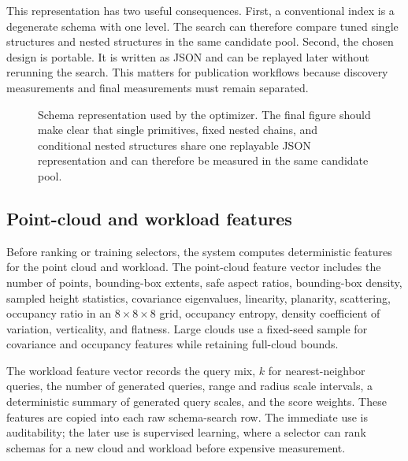 This representation has two useful consequences. First, a conventional index is a degenerate schema with one level. The search can therefore compare tuned single structures and nested structures in the same candidate pool. Second, the chosen design is portable. It is written as JSON and can be replayed later without rerunning the search. This matters for publication workflows because discovery measurements and final measurements must remain separated.

\begin{figure}[t]
  \centering
  \caption{Schema representation used by the optimizer. The final figure should make clear that single primitives, fixed nested chains, and conditional nested structures share one replayable JSON representation and can therefore be measured in the same candidate pool.}
  \label{fig:schema-representation}
\end{figure}

\subsection{Point-cloud and workload features}

Before ranking or training selectors, the system computes deterministic features for the point cloud and workload. The point-cloud feature vector includes the number of points, bounding-box extents, safe aspect ratios, bounding-box density, sampled height statistics, covariance eigenvalues, linearity, planarity, scattering, occupancy ratio in an $8\times8\times8$ grid, occupancy entropy, density coefficient of variation, verticality, and flatness. Large clouds use a fixed-seed sample for covariance and occupancy features while retaining full-cloud bounds.

The workload feature vector records the query mix, $k$ for nearest-neighbor queries, the number of generated queries, range and radius scale intervals, a deterministic summary of generated query scales, and the score weights. These features are copied into each raw schema-search row. The immediate use is auditability; the later use is supervised learning, where a selector can rank schemas for a new cloud and workload before expensive measurement.

